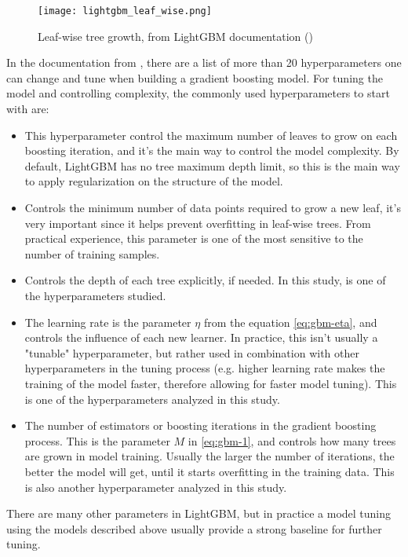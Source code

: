 \begin{figure}[!h]
    \centering
    \texttt{[image: lightgbm\_leaf\_wise.png]} 
    \caption{Leaf-wise tree growth, from LightGBM documentation (\cite{lightgbmparams})}
    \label{fig:lightgbm-grow} 
  \end{figure}

In the documentation from \cite{lightgbmparams}, there are a list of more than 20 hyperparameters one can change and tune when building a gradient boosting model. For tuning the model and controlling complexity, the commonly used hyperparameters to start with are:

\begin{itemize}

    \item \textbf{}
    
    This hyperparameter control the maximum number of leaves to grow on each boosting iteration, and it's the main way to control the model complexity. By default, LightGBM has no tree maximum depth limit, so this is the main way to apply regularization on the structure of the model. 

    \item \textbf{}
    
    Controls the minimum number of data points required to grow a new leaf, it's very important since it helps prevent overfitting in leaf-wise trees. From practical experience, this parameter is one of the most sensitive to the number of training samples.

    \item \textbf{}
    
    Controls the depth of each tree explicitly, if needed. In this study,  is one of the hyperparameters studied.

    \item \textbf{}
    
    The learning rate is the parameter $\eta$ from the equation \ref{eq:gbm-eta}, and controls the influence of each new learner. In practice, this isn't usually a "tunable" hyperparameter, but rather used in combination with other hyperparameters in the tuning process (e.g. higher learning rate makes the training of the model faster, therefore allowing for faster model tuning). This is one of the hyperparameters analyzed in this study. 

   \item \textbf{}
   
   The number of estimators or boosting iterations in the gradient boosting process. This is the parameter $M$ in \ref{eq:gbm-1}, and controls how many trees are grown in model training. Usually the larger the number of iterations, the better the model will get, until it starts overfitting in the training data. This is also another hyperparameter analyzed in this study.

\end{itemize}

There are many other parameters in LightGBM, but in practice a model tuning using the models described above usually provide a strong baseline for further tuning.
